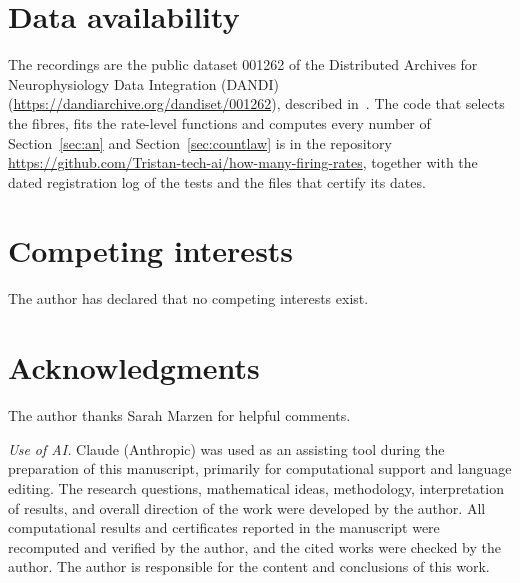 
\section*{Data availability}
The recordings are the public dataset 001262 of the Distributed Archives for Neurophysiology Data Integration (DANDI) (\url{https://dandiarchive.org/dandiset/001262}), described
in~\cite{Heeringa2024}. The code that selects the fibres, fits the rate-level functions and computes every number of
Section~\ref{sec:an} and Section~\ref{sec:countlaw} is in the repository \url{https://github.com/Tristan-tech-ai/how-many-firing-rates},
together with the dated registration log of the tests and the files that certify its dates.

\section*{Competing interests}
The author has declared that no competing interests exist.

\section*{Acknowledgments}
The author thanks Sarah Marzen for helpful comments.

\emph{Use of AI.} Claude (Anthropic) was used as an assisting tool during the preparation of this manuscript, primarily for
computational support and language editing. The research questions, mathematical ideas, methodology, interpretation of results, and
overall direction of the work were developed by the author. All computational results and certificates reported in the manuscript
were recomputed and verified by the author, and the cited works were checked by the author. The author is responsible for the content
and conclusions of this work.
